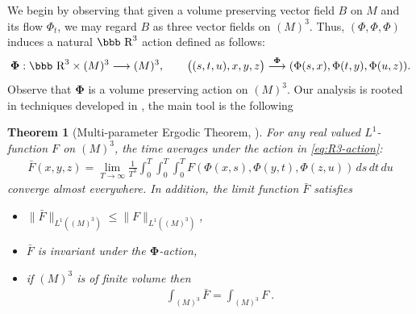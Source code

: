 \documentclass[12pt]{article}
\numberwithin{equation}{section}
\newtheorem{theorem}{Theorem}[section]
\newcommand{\R}{\mbox{\bbb R}}       %
\begin{document}
We begin by observing that given a volume preserving vector field $B$ on $M$ and its flow $\Phi_t$, 
we may regard $B$ as three vector fields on $(M)^3$. Thus, $(\Phi,\Phi,\Phi)$ induces a natural $\R^3$ action defined as follows:
\begin{equation}\label{eq:R3-action}
 \mathbf{\Phi}:\R^3\times (M)^3\longrightarrow (M)^3,\qquad \bigl((s,t,u),x,y,z\bigr)\stackrel{\mathbf{\Phi}}{\longrightarrow} (\Phi(s,x),\Phi(t,y), \Phi(u,z)).
\end{equation}
Observe that $\mathbf{\Phi}$ is a volume preserving action on $(M)^3$.  Our analysis is rooted in techniques developed in \cite{Arnold86, Laurence-Avellaneda93, Laurence-Stredulinsky00b, Vogel03}, the main tool is the following

\begin{theorem}[Multi-parameter Ergodic Theorem, \cite{Becker81}]\label{th:multi-ergodic}
 For any real valued $L^1$-function $F$ on $(M)^3$, the time
averages under the action in \eqref{eq:R3-action}:
\begin{gather*}
\bar{F}(x,y,z)=\lim_{T\to \infty}\frac{1}{T^3}\int^T_0\int^T_0\int^T_0
 F(\Phi(x,s),\Phi(y,t),\Phi(z,u))\,d s\,d t\,d u
\end{gather*}
converge almost everywhere. In addition, the limit function
$\bar{F}$ satisfies
\begin{itemize}
 \item[(i)] $\|\bar{F}\|_{L^1((M)^3)}\leq \|F\|_{L^1((M)^3)}$,
 \item[(ii)] $\bar{F}$ is invariant under the $\mathbf{\Phi}$-action,
 \item[(iii)] if $(M)^3$ is of finite volume then
\begin{gather}\label{eq:ergodic-integrals-equal}
 \int_{(M)^3}\bar{F} =\int_{(M)^3} F\ .
\end{gather}
\end{itemize}
\end{theorem}
\end{document}
